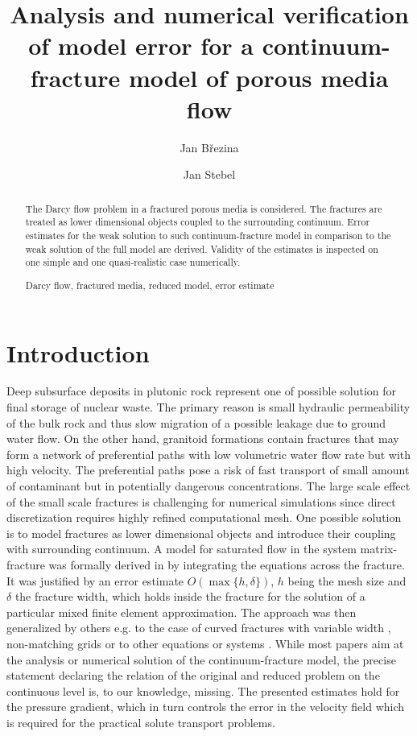 \documentclass{llncs}
\newcommand{\keywords}[1]{\par\addvspace\baselineskip
\noindent\keywordname\enspace\ignorespaces#1}
\begin{document}
\title{Analysis and numerical verification of model error for a continuum-fracture model of porous media flow}
\author{Jan B\v rezina \and Jan Stebel}

\maketitle

\begin{abstract}
The Darcy flow problem in a fractured porous media is considered. The fractures are treated as
lower dimensional objects coupled to the surrounding continuum. Error estimates for the weak solution 
to such continuum-fracture model in comparison to the weak solution of the full model are derived.
Validity of the estimates is inspected on one simple and one quasi-realistic case numerically.
\keywords{Darcy flow, fractured media, reduced model, error estimate}
\end{abstract}

\section{Introduction}


Deep subsurface deposits in plutonic rock represent one of possible solution for final storage of nuclear waste. The primary reason is 
small hydraulic permeability of the bulk rock and thus slow migration of a possible leakage due to ground water flow.  On the other hand, 
granitoid formations contain fractures that may form a network of preferential paths with low volumetric water flow rate but with 
high velocity. The preferential paths pose a risk of fast transport of small amount of contaminant but in potentially dangerous concentrations.
The large scale effect of the small scale fractures is challenging for numerical simulations since direct discretization requires highly refined
computational mesh. One possible solution is to model fractures as lower dimensional objects and introduce their coupling with surrounding continuum.
A model for saturated flow in the system matrix-fracture was formally derived in \cite{martin_modeling_2005} by integrating the equations across the fracture.
It was justified by an error estimate $O(\max\{h,\delta\})$, $h$ being the mesh size and $\delta$ the fracture width, which holds inside the fracture for the solution of a particular mixed finite element approximation.
The approach was then generalized by others e.g. to the case of curved fractures with variable width \cite{angot_asymptotic_2009}, non-matching grids \cite{frih_modeling_2012} or to other equations or systems \cite{lesinigo_multiscale_2011,fumagalli_reduced_2013,ganis_modeling_2014}.
While most papers aim at the analysis or numerical solution of the continuum-fracture model, the precise statement declaring the relation of the original and reduced problem on the continuous level is, to our knowledge, missing.
The presented estimates hold for the pressure gradient, which in turn controls the error in the velocity field which is required for the  
practical solute transport problems.
\end{document}
